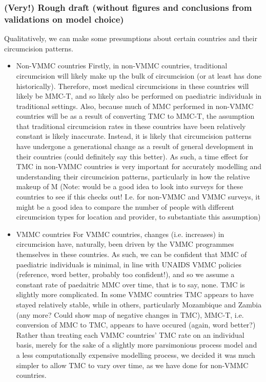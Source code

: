 \documentclass{article}
\begin{document}
\subsubsection*{(Very!) Rough draft (without figures and conclusions from validations on model choice)}
\label{sec:org2a43f36}

Qualitatively, we can make some presumptions about certain countries and their circumcision patterns.

\begin{itemize}
\item Non-VMMC countries
\label{sec:orgd0f7914}
Firstly, in non-VMMC countries, traditional circumcision will likely make up the bulk of circumcision (or at least has done historically).
Therefore, most medical circumcisions in these countries will likely be MMC-T, and so likely also be performed on paediatric individuals in traditional settings.
Also, because much of MMC performed in non-VMMC countries will be as a result of converting TMC to MMC-T, the assumption that traditional circumcision rates in these countries have been relatively constant is likely inaccurate.
Instead, it is likely that circumcision patterns have undergone a generational change as a result of general development in their countries (could definitely say this better). As such, a time effect for TMC in non-VMMC countries is very important for accurately modelling and understanding their circumcision patterns, particularly in how the relative makeup of M
(Note: would be a good idea to look into surveys for these countries to see if this checks out! I.e. for non-VMMC and VMMC surveys, it might be a good idea to compare the number of people with different circumcision types for location and provider,  to substantiate this assumption)

\item VMMC countries
\label{sec:orgec5a9ea}
For VMMC countries, changes (i.e. increases) in circumcision have, naturally, been driven by the VMMC programmes themselves in these countries.
As such, we can be confident that MMC of paediatric individuals is minimal, in line with UNAIDS VMMC policies (reference, word better, probably too confident!), and so we assume a constant rate of paedaitric MMC over time, that is to say, none.
TMC is slightly more complicated.
In some VMMC countries TMC appears to have stayed relatively stable, while in others, particularly Mozambique and Zambia (any more? Could show map of negative changes in TMC), MMC-T, i.e. conversion of MMC to TMC, appears to have occured (again, word better?)
Rather than treating each VMMC countries' TMC rate on an individual basis, merely for the sake of a slightly more parsimonious process model and a less computationally expensive modelling process, we decided it was much simpler to allow TMC to vary over time, as we have done for non-VMMC countries. 


\end{itemize}
\end{document}
